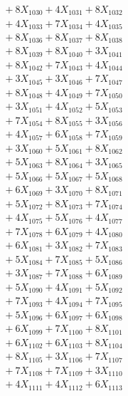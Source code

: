 \documentclass[a4paper,10pt]{article}
\begin{document}
{\begin{align}
&\;  + 8 X_{1030} + 4 X_{1031} + 8 X_{1032} \\[0.3ex]
&\;  + 4 X_{1033} + 7 X_{1034} + 4 X_{1035} \\[0.3ex]
&\;  + 8 X_{1036} + 8 X_{1037} + 8 X_{1038} \\[0.3ex]
&\;  + 8 X_{1039} + 8 X_{1040} + 3 X_{1041} \\[0.3ex]
&\;  + 8 X_{1042} + 7 X_{1043} + 4 X_{1044} \\[0.3ex]
&\;  + 3 X_{1045} + 3 X_{1046} + 7 X_{1047} \\[0.3ex]
&\;  + 8 X_{1048} + 4 X_{1049} + 7 X_{1050} \\[0.3ex]
&\;  + 3 X_{1051} + 4 X_{1052} + 5 X_{1053} \\[0.3ex]
&\;  + 7 X_{1054} + 8 X_{1055} + 3 X_{1056} \\[0.3ex]
&\;  + 4 X_{1057} + 6 X_{1058} + 7 X_{1059} \\[0.5ex]\allowbreak
&\;  + 3 X_{1060} + 5 X_{1061} + 8 X_{1062} \\[0.3ex]
&\;  + 5 X_{1063} + 8 X_{1064} + 3 X_{1065} \\[0.3ex]
&\;  + 5 X_{1066} + 5 X_{1067} + 5 X_{1068} \\[0.3ex]
&\;  + 6 X_{1069} + 3 X_{1070} + 8 X_{1071} \\[0.3ex]
&\;  + 5 X_{1072} + 8 X_{1073} + 7 X_{1074} \\[0.3ex]
&\;  + 4 X_{1075} + 5 X_{1076} + 4 X_{1077} \\[0.3ex]
&\;  + 7 X_{1078} + 6 X_{1079} + 4 X_{1080} \\[0.3ex]
&\;  + 6 X_{1081} + 3 X_{1082} + 7 X_{1083} \\[0.3ex]
&\;  + 5 X_{1084} + 7 X_{1085} + 5 X_{1086} \\[0.3ex]
&\;  + 3 X_{1087} + 7 X_{1088} + 6 X_{1089} \\[0.5ex]\allowbreak
&\;  + 5 X_{1090} + 4 X_{1091} + 5 X_{1092} \\[0.3ex]
&\;  + 7 X_{1093} + 4 X_{1094} + 7 X_{1095} \\[0.3ex]
&\;  + 5 X_{1096} + 6 X_{1097} + 6 X_{1098} \\[0.3ex]
&\;  + 6 X_{1099} + 7 X_{1100} + 8 X_{1101} \\[0.3ex]
&\;  + 6 X_{1102} + 6 X_{1103} + 8 X_{1104} \\[0.3ex]
&\;  + 8 X_{1105} + 3 X_{1106} + 7 X_{1107} \\[0.3ex]
&\;  + 7 X_{1108} + 7 X_{1109} + 3 X_{1110} \\[0.3ex]
&\;  + 4 X_{1111} + 4 X_{1112} + 6 X_{1113} \\[0.3ex]

\end{align}}
\end{document}
